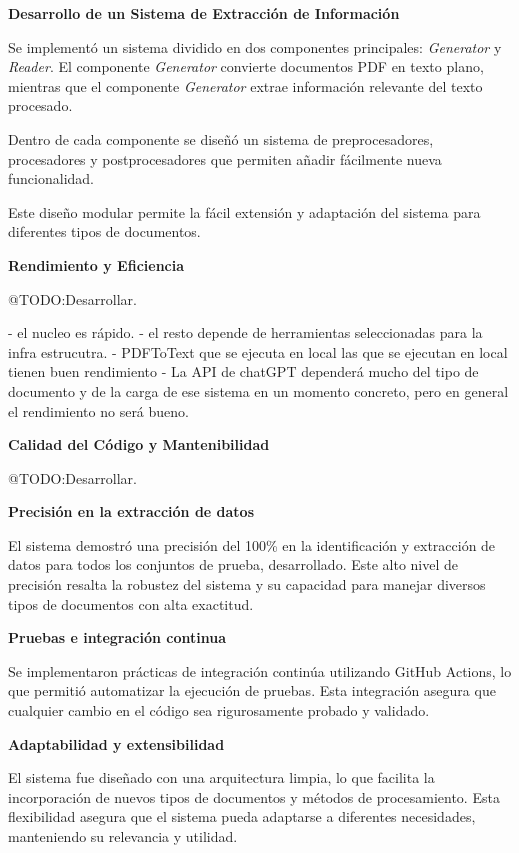 \textbf{Desarrollo de un Sistema de Extracción de Información}

Se implementó un sistema dividido en dos componentes principales: \textit{Generator} y \textit{Reader}.
El componente \textit{Generator} convierte documentos PDF en texto plano, mientras que el componente \textit{Generator}
extrae información relevante del texto procesado.

Dentro de cada componente se diseñó un sistema de preprocesadores, procesadores y postprocesadores que permiten
añadir fácilmente nueva funcionalidad.

Este diseño modular permite la fácil extensión y adaptación del sistema para diferentes tipos de documentos.

\textbf {Rendimiento y Eficiencia}

\colorbox{color_highlight}{@TODO:Desarrollar.}

- el nucleo es rápido.
- el resto depende de herramientas seleccionadas para la infra estrucutra.
- PDFToText que se ejecuta en local las que se ejecutan en local tienen buen rendimiento
- La API de chatGPT dependerá mucho del tipo de documento y de la carga de ese sistema en un momento concreto, pero
en general el rendimiento no será bueno.

\textbf {Calidad del Código y Mantenibilidad}

\colorbox{color_highlight}{@TODO:Desarrollar.}


\textbf {Precisión en la extracción de datos}

El sistema demostró una precisión del 100\% en la identificación y extracción de datos para todos los conjuntos de
prueba, desarrollado.
Este alto nivel de precisión resalta la robustez del sistema y su capacidad para manejar diversos tipos de documentos
con alta exactitud.

\textbf {Pruebas e integración continua}

Se implementaron prácticas de integración continúa utilizando GitHub Actions, lo que permitió automatizar la ejecución
de pruebas.
Esta integración asegura que cualquier cambio en el código sea rigurosamente probado y validado.

\textbf {Adaptabilidad y extensibilidad}

El sistema fue diseñado con una arquitectura limpia, lo que facilita la incorporación de nuevos tipos de documentos y
métodos de procesamiento.
Esta flexibilidad asegura que el sistema pueda adaptarse a diferentes necesidades, manteniendo su relevancia y utilidad.


